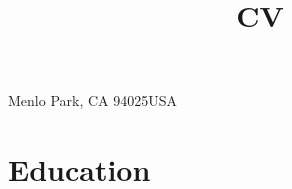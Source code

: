 \documentclass[11pt,a4paper,sans]{moderncv}        %
\begin{document}
\title{CV}  %
\address{2575 Sandhill Road}{Menlo Park, CA 94025}{USA}%
\makecvtitle

\section{Education}

\iffalse
\section{Ph.D Thesis}
\cvitem{Title}{\emph{Design for  Staged Two Beam Acceleration at the Argonne Wakefield Accelerator}}
\cvitem{Advisors}{Linda Spentzouris, John Power}
\cvitem{Summary}{
	I discuss beam line design, simulation, and optimization, of a 
	beam line with the potential for dielectric two beam acceleration.
    Preliminary and prepratory experimental measurements
    are included.    }
\fi
\end{document}
